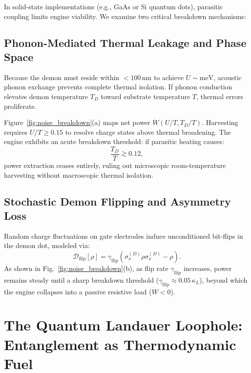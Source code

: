 \documentclass[10pt,twocolumn,a4paper]{article}
\begin{document}
In solid-state implementations (e.g., GaAs or Si quantum dots), parasitic coupling limits engine viability. We examine two critical breakdown mechanisms:

\subsection{Phonon-Mediated Thermal Leakage and Phase Space}
Because the demon must reside within $< 100\,\mathrm{nm}$ to achieve $U \sim \mathrm{meV}$, acoustic phonon exchange prevents complete thermal isolation. If phonon conduction elevates demon temperature $T_D$ toward substrate temperature $T$, thermal errors proliferate.

Figure~\ref{fig:noise_breakdown}(a) maps net power $\dot{W}(U/T, T_D/T)$. Harvesting requires $U/T \ge 0.15$ to resolve charge states above thermal broadening. The engine exhibits an acute breakdown threshold: if parasitic heating causes:
\begin{equation}
\frac{T_D}{T} \gtrsim 0.12,
\end{equation}
power extraction ceases entirely, ruling out microscopic room-temperature harvesting without macroscopic thermal isolation.

\subsection{Stochastic Demon Flipping and Asymmetry Loss}
Random charge fluctuations on gate electrodes induce unconditioned bit-flips in the demon dot, modeled via:
\begin{equation}
\mathcal{D}_{\mathrm{flip}}[\rho] = \gamma_{\mathrm{flip}} \left( \sigma_x^{(D)} \rho \sigma_x^{(D)} - \rho \right).
\end{equation}
As shown in Fig.~\ref{fig:noise_breakdown}(b), as flip rate $\gamma_{\mathrm{flip}}$ increases, power remains steady until a sharp breakdown threshold ($\gamma_{\mathrm{flip}} \approx 0.05\,\kappa_L$), beyond which the engine collapses into a passive resistive load ($\dot{W} < 0$).

\section{The Quantum Landauer Loophole: Entanglement as Thermodynamic Fuel}
\end{document}
